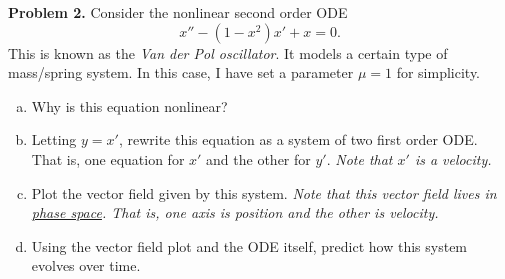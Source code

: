 \documentclass[12pt]{report} %
\theoremstyle{definition}
\begin{document}
\noindent\textbf{Problem 2.} Consider the nonlinear second order ODE 
\[
x''- (1-x^2)x'+x = 0.
\]
This is known as the \emph{Van der Pol oscillator}. It models a certain type of mass/spring system. In this case, I have set a parameter $\mu=1$ for simplicity.
\begin{enumerate}[(a)]
    \item Why is this equation nonlinear?
    \item Letting $y=x'$, rewrite this equation as a system of two first order ODE. That is, one equation for $x'$ and the other for $y'$. \emph{Note that $x'$ is a velocity.}
    \item Plot the vector field given by this system. \emph{Note that this vector field lives in \underline{phase space}. That is, one axis is position and the other is velocity.}
    \item Using the vector field plot and the ODE itself, predict how this system evolves over time. 
\end{enumerate}
\end{document}
